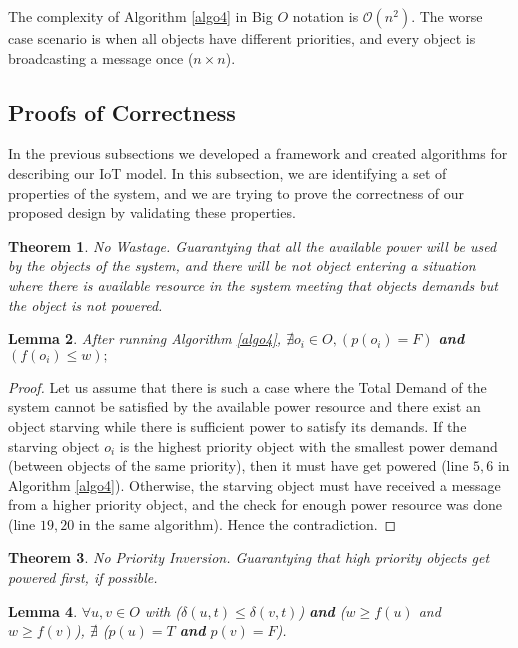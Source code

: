 \documentclass[../main/IoT.tex]{subfiles}
\begin{document}
The complexity of Algorithm \ref{algo4} in Big $O$ notation is $\mathcal{O}(n^2)$. The worse case scenario is when all objects have different priorities, and every object is broadcasting a message once ($n\times n$).

\subsection{Proofs of Correctness}
In the previous subsections we developed a framework and created algorithms for describing our IoT model. In this subsection, we are identifying a set of properties of the system, and we are trying to prove the correctness of our proposed design by validating these properties.
\newtheorem{theorem}{Theorem}[section]
\newtheorem{lemma}[theorem]{Lemma}
\begin{theorem}
\emph{No Wastage}. Guarantying that all the available power will be used by the objects of the system, and there will be not object entering a situation where there is available resource in the system meeting that objects demands but the object is not powered.
\end{theorem}

\begin{lemma}\label{lemma1}
  After running Algorithm \ref{algo4}, $\nexists o_{i}\in O, (p(o_{i}) = F)$ \textbf{and} $(f(o_{i})\leq w); $
\end{lemma}

\begin{proof} Let us assume that there is such a case where the Total Demand of the system cannot be satisfied by the available power resource and there exist an object starving while there is sufficient power to satisfy its demands. If the starving object $o_{i}$ is the highest priority object with the smallest power demand (between objects of the same priority), then it must have get powered (line $5,6$ in Algorithm \ref{algo4}). Otherwise, the starving object must have received a message from a higher priority object, and the check for enough power resource was done (line $19, 20$ in the same algorithm). Hence the contradiction.
\end{proof}


\begin{theorem}
\emph{No Priority Inversion}. Guarantying that high priority objects get powered first, if possible.
\end{theorem}
\begin{lemma}\label{lemma2}
    $\forall u,v \in O$ with ($\delta(u,t) \le \delta(v,t)$) \textbf{and} ($w\geq f(u)$ and $w\geq f(v)$), $\nexists$ ($ p(u)=T$ \textbf{and} $p(v)=F$).
\end{lemma}
\end{document}

